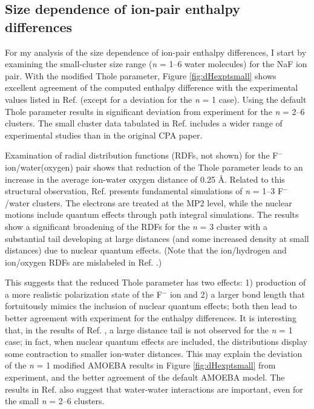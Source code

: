 \begin{cpa}
  \subsection{\label{ch5:sec3:level3}Size dependence of ion-pair enthalpy differences}
  For my analysis of the size dependence of ion-pair enthalpy differences, I start by examining the small-cluster size range (\emph{n} = 1--6 water molecules) for the NaF 
  ion pair. With the modified Thole parameter, Figure \ref{fig:dHexptsmall} shows excellent agreement of the computed enthalpy difference with the experimental values
  listed in Ref. \cite{donald2010expand_cpa} (except for a deviation for the \emph{n} = 1 case). Using the default Thole parameter results in significant deviation 
  from experiment for the \emph{n} = 2--6 clusters. The small cluster data tabulated in Ref. \cite{donald2010expand_cpa} includes a wider range of experimental studies
  than in the original CPA paper\cite{coe1998cpa1}.

  Examination of radial distribution functions (RDFs, not shown) for the F$^-$ ion/water(oxygen) pair shows that reduction of the Thole parameter leads to an increase in the 
  average ion-water oxygen distance of 0.25 {\AA}. Related to this structural observation, Ref. \cite{kawashima2013ab} presents fundamental simulations of \emph{n} = 1--3 F$^-$/water
  clusters. The electrons are treated at the MP2 level, while the nuclear motions include quantum effects through path integral simulations. The results show a 
  significant broadening of the RDFs for the \emph{n} = 3 cluster with a substantial tail developing at large distances (and some increased density at small distances) due to
  nuclear quantum effects. (Note that the ion/hydrogen and ion/oxygen RDFs are mislabeled in Ref. \cite{kawashima2013ab}.)

  This suggests that the reduced Thole parameter has two effects: 1) production of a more realistic polarization state of the F$^-$ ion and 2) a larger bond length that 
  fortuitously mimics the inclusion of nuclear quantum effects; both then lead to better agreement with experiment for the enthalpy differences.  It is interesting
  that, in the results of Ref. \cite{kawashima2013ab}, a large distance tail is not observed for the \emph{n} = 1 case; in fact, when nuclear quantum effects are included, 
  the distributions display some contraction to smaller ion-water distances. This may explain the deviation of the \emph{n} = 1 modified AMOEBA results in Figure 
  \ref{fig:dHexptsmall} from experiment, and the better agreement of the default AMOEBA model. The results in Ref. \cite{kawashima2013ab} also suggest that water-water
  interactions are important, even for the small \emph{n} = 2--6 clusters. 
  

\end{cpa}
